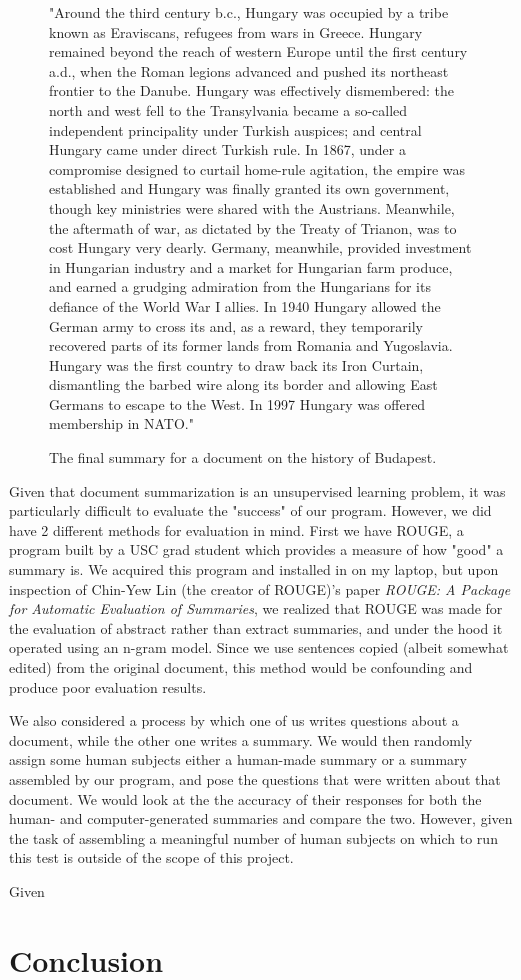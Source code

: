 \documentclass[12pt]{article}
\theoremstyle{plain}
\theoremstyle{definition}
\theoremstyle{remark}
\theoremstyle{plain}
\begin{document}
\begin{figure}
	
"Around the third century b.c., Hungary was occupied by a tribe known as Eraviscans, refugees from wars in Greece. Hungary remained beyond the reach of western Europe until the first century a.d., when the Roman legions advanced and pushed its northeast frontier to the Danube. Hungary was effectively dismembered: the north and west fell to the Transylvania became a so-called independent principality under Turkish auspices; and central Hungary came under direct Turkish rule. In 1867, under a compromise designed to curtail home-rule agitation, the empire was established and Hungary was finally granted its own government, though key ministries were shared with the Austrians. Meanwhile, the aftermath of war, as dictated by the Treaty of Trianon, was to cost Hungary very dearly. Germany, meanwhile, provided investment in Hungarian industry and a market for Hungarian farm produce, and earned a grudging admiration from the Hungarians for its defiance of the World War I allies. In 1940 Hungary allowed the German army to cross its and, as a reward, they temporarily recovered parts of its former lands from Romania and Yugoslavia. Hungary was the first country to draw back its Iron Curtain, dismantling the barbed wire along its border and allowing East Germans to escape to the West. In 1997 Hungary was offered membership in NATO."
\caption{The final summary for a document on the history of Budapest.}\label{goodsummary}
\end{figure}


 


	Given that document summarization is an unsupervised learning problem, it was particularly difficult to evaluate the "success" of our program. However, we did have 2 different methods for evaluation in mind. First we have ROUGE, a program built by a USC grad student which provides a measure of how "good" a summary is. We acquired this program and installed in on my laptop, but upon inspection of Chin-Yew Lin (the creator of ROUGE)'s paper \emph{ROUGE: A Package for Automatic Evaluation of Summaries}, we realized that ROUGE was made for the evaluation of abstract rather than extract summaries, and under the hood it operated using an n-gram model. Since we use sentences copied (albeit somewhat edited) from the original document, this method would be confounding and produce poor evaluation results.
	
We also considered a process by which one of us writes questions about a document, while the other one writes a summary. We would then randomly assign some human subjects either a human-made summary or a summary assembled by our program, and pose the questions that were written about that document. We would look at the the accuracy of their responses for both the human- and computer-generated summaries and compare the two. However, given the task of assembling a meaningful number of human subjects on which to run this test is outside of the scope of this project.

Given



\section{Conclusion}
	
\end{document}
